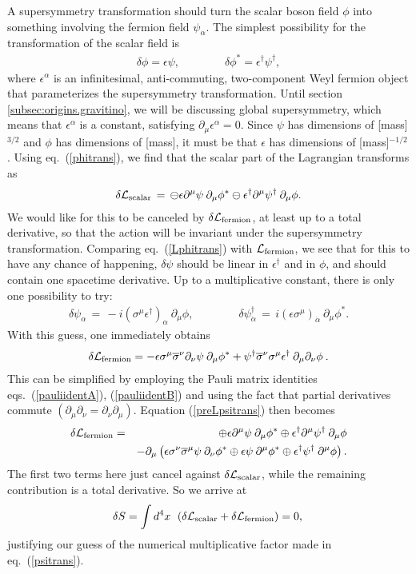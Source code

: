 \documentclass[12pt]{article}
\def\BDpos{}
\def\BDneg{-}
\def\BDplus{+}
\def\BDminus{-}
\def\BDpos{-}
\def\BDneg{}
\def\BDplus{-}
\def\BDminus{+}
\def\BDpos{\oplus}
\def\BDneg{\ominus}
\def\BDplus{\oplus}
\def\BDminus{\ominus}
\def\BDpos{\ominus}
\def\BDneg{\oplus}
\def\BDplus{\ominus}
\def\BDminus{\oplus}
\def\beq{\begin{eqnarray}}
\def\eeq{\end{eqnarray}}
\def\lagr{{\cal L}}
\def\deltaeps{\delta}
\def\sigmabar{\overline\sigma}
\begin{document}
A supersymmetry transformation should turn the scalar boson field $\phi$
into something involving the fermion field $\psi_\alpha$. The simplest
possibility for the transformation of the scalar field is
\beq
\deltaeps \phi = \epsilon \psi,\qquad\qquad
\deltaeps \phi^* = \epsilon^\dagger \psi^\dagger ,
\label{phitrans}
\eeq
where $\epsilon^\alpha$ is an infinitesimal, anti-commuting, two-component
Weyl fermion object that parameterizes the supersymmetry transformation. Until
section \ref{subsec:origins.gravitino}, we will be discussing global
supersymmetry, which means that $\epsilon^\alpha$ is a constant,
satisfying $\partial_\mu \epsilon^\alpha=0$. Since $\psi$ has dimensions
of [mass]$^{3/2}$ and $\phi$ has dimensions of [mass], it must be that
$\epsilon$ has dimensions of [mass]$^{-1/2}$. Using eq.~(\ref{phitrans}),
we find that the scalar part of the Lagrangian transforms as
\beq
\deltaeps
\lagr_{\rm scalar} \,=\, 
\BDpos \epsilon \partial^\mu \psi \> \partial_\mu \phi^*
\BDplus \epsilon^\dagger \partial^\mu \psi^\dagger \> \partial_\mu \phi .
\label{Lphitrans}
\eeq
We would like for this to be canceled by $\deltaeps\lagr_{\rm fermion}$,
at least up to a total derivative, so that the action will be invariant
under the supersymmetry transformation. Comparing eq.~(\ref{Lphitrans})
with $\lagr_{\rm fermion}$, we see that for this to have any chance of
happening, $\deltaeps \psi$ should be linear in $\epsilon^\dagger$ and in
$\phi$, and should contain one spacetime derivative. Up to a
multiplicative constant, there is only one possibility to try:
\beq
\deltaeps\psi_\alpha
\,=\,
- i (\sigma^\mu \epsilon^\dagger)_\alpha\> \partial_\mu \phi,
\qquad\qquad
\deltaeps\psi^\dagger_{\dot{\alpha}}
\,=\,
 i (\epsilon\sigma^\mu)_{\dot{\alpha}}\>   \partial_\mu \phi^* .
\label{psitrans}
\eeq
With this guess, one immediately obtains
\beq
\deltaeps \lagr_{\rm fermion} =
-\epsilon \sigma^\mu \sigmabar^\nu \partial_\nu \psi\> \partial_\mu \phi^*
+\psi^\dagger \sigmabar^\nu \sigma^\mu \epsilon^\dagger \>
\partial_\mu \partial_\nu \phi
\> .
\label{preLpsitrans}
\eeq
This can be simplified by employing the
Pauli matrix identities eqs.~(\ref{pauliidentA}), (\ref{pauliidentB}) 
and using the fact that partial derivatives commute
$(\partial_\mu\partial_\nu = \partial_\nu\partial_\mu)$. Equation
(\ref{preLpsitrans}) then becomes
\beq
\deltaeps \lagr_{\rm fermion} & = &
\BDneg \epsilon\partial^\mu\psi\> \partial_\mu\phi^*
\BDminus \epsilon^\dagger \partial^\mu\psi^\dagger\> \partial_\mu \phi
\nonumber\\ && 
- \partial_\mu \left (
\epsilon \sigma^\nu \sigmabar^\mu \psi \> \partial_\nu \phi^* 
\BDminus \epsilon \psi\> \partial^\mu \phi^*
\BDminus \epsilon^\dagger \psi^\dagger \> \partial^\mu \phi \right ).
\label{Lpsitrans}
\eeq
The first two terms here just cancel against $\deltaeps\lagr_{\rm
scalar}$, while the remaining contribution is a total derivative. So we
arrive at
\beq
\deltaeps S =
\int d^4x \>\>\, (\deltaeps \lagr_{\rm scalar} + \deltaeps
\lagr_{\rm fermion})
= 0,\>
\label{invar}
\eeq
justifying our guess of the numerical multiplicative factor made in
eq.~(\ref{psitrans}). 
\end{document}
